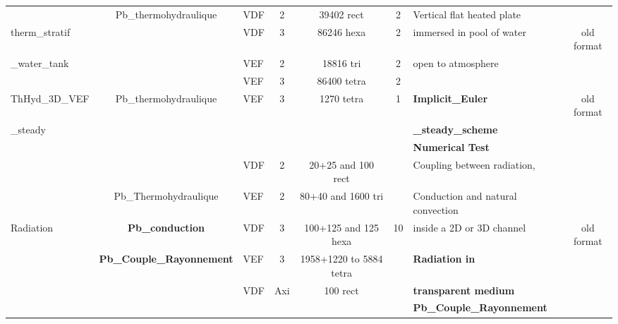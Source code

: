 \begin{table}[H]
\begin{centering}
\begin{tabular}{lclccclc}
\hline
\rowcolor{ForestGreen!10} & Pb\_thermohydraulique & VDF & 2 & 39402 rect & 2 & Vertical flat heated plate & \\ 
\rowcolor{ForestGreen!10}therm\_stratif & & VDF & 3 & 86246 hexa & 2 & immersed in pool of water & old format \\
\rowcolor{ForestGreen!10}\_water\_tank & & VEF & 2 & 18816 tri & 2 & open to atmosphere & \\
\rowcolor{ForestGreen!10} & & VEF & 3 & 86400 tetra & 2 & & \\
\hline
\rowcolor{ForestGreen!10}ThHyd\_3D\_VEF & Pb\_thermohydraulique & VEF & 3 & 1270 tetra & 1 & \textbf{Implicit\_Euler} & old format \\
\rowcolor{ForestGreen!10} \_steady & & & & & & \textbf{\_steady\_scheme} & \\
\rowcolor{ForestGreen!10} & & & & & & \textbf{Numerical Test} & \\
\hline
\rowcolor{ForestGreen!10}& & VDF & 2 & 20+25 and 100 rect & & Coupling between radiation, & \\
\rowcolor{ForestGreen!10} & Pb\_Thermohydraulique & VEF & 2 & 80+40 and 1600 tri & & Conduction and natural convection  & \\ 
\rowcolor{ForestGreen!10}Radiation & \textbf{Pb\_conduction} & VDF & 3 & 100+125 and 125 hexa & 10 & inside a 2D or 3D channel & old format \\
\rowcolor{ForestGreen!10} & \textbf{Pb\_Couple\_Rayonnement} & VEF & 3 & 1958+1220 to 5884 tetra & & \textbf{Radiation in} & \\ 
\rowcolor{ForestGreen!10} & & VDF & Axi & 100 rect & & \textbf{transparent medium} & \\ 
\rowcolor{ForestGreen!10} & & & & & & \textbf{Pb\_Couple\_Rayonnement} & \\
\hline
\end{tabular}
\end{centering}
\end{table}

\newpage

